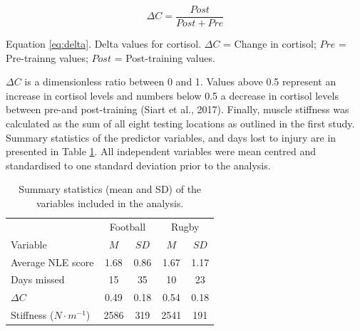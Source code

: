\documentclass[
  english,
  man,floatsintext]{apa6}
\begin{document}
\begin{equation} 
  \Delta C = \frac{Post}{Post + Pre}
  \label{eq:delta}
\end{equation}

\noindent Equation \eqref{eq:delta}. Delta values for cortisol. \(\Delta C\) = Change in cortisol; \(Pre\) = Pre-trainng values; \(Post\) = Post-training values.

\(\Delta C\) is a dimensionless ratio between 0 and 1. Values above 0.5 represent an increase in cortisol levels and numbers below 0.5 a decrease in cortisol levels between pre-and post-training (Siart et al., 2017).
Finally, muscle stiffness was calculated as the sum of all eight testing locations as outlined in the first study.
Summary statistics of the predictor variables, and days lost to injury are in presented in Table \ref{tab:descriptivevars}.
All independent variables were mean centred and standardised to one standard deviation prior to the analysis.

\begin{table}[H]

\begin{center}
\begin{threeparttable}

\caption{\label{tab:descriptivevars}Summary statistics (mean and SD) of the variables included in the analysis.}

\begin{tabular}{lcccc}
\toprule
 & \multicolumn{2}{c}{Football} & \multicolumn{2}{c}{Rugby} \\
\cmidrule(r){2-3} \cmidrule(r){4-5}
Variable & $M$ & $SD$ & $M$ & $SD$\\
\midrule
Average NLE score & 1.68 & 0.86 & 1.67 & 1.17\\
Days missed & 15 & 35 & 10 & 23\\
$\Delta C$ & 0.49 & 0.18 & 0.54 & 0.18\\
Stiffness ($\si{N \cdot m^{-1}}$) & 2586 & 319 & 2541 & 191\\
\bottomrule
\end{tabular}

\end{threeparttable}
\end{center}

\end{table}
\end{document}
